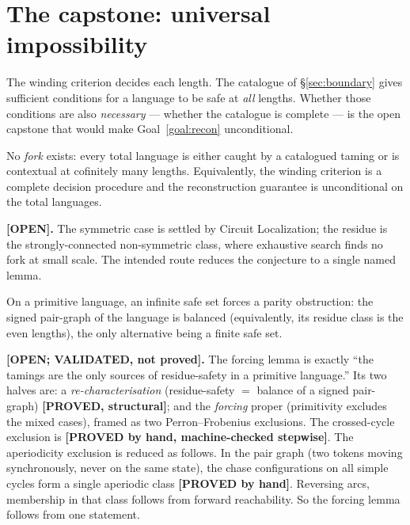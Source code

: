 \section{The capstone: universal impossibility}\label{sec:capstone}

The winding criterion decides each length. The catalogue of \S\ref{sec:boundary}
gives sufficient conditions for a language to be safe at \emph{all} lengths. Whether
those conditions are also \emph{necessary} --- whether the catalogue is complete ---
is the open capstone that would make Goal~\ref{goal:recon} unconditional.

\begin{conjecture}\label{conj:universal}
No \emph{fork} exists: every total language is either caught by a catalogued taming
or is contextual at cofinitely many lengths. Equivalently, the winding criterion is
a complete decision procedure and the reconstruction guarantee is unconditional on
the total languages.
\end{conjecture}

\noindent\textbf{[OPEN].} The symmetric case is settled by Circuit Localization;
the residue is the strongly-connected non-symmetric class, where exhaustive search
finds no fork at small scale. The intended route reduces the conjecture to a single
named lemma.

\begin{namedlemma}\label{lem:forcing}
On a primitive language, an infinite safe set forces a parity obstruction: the
signed pair-graph of the language is balanced (equivalently, its residue class is
the even lengths), the only alternative being a finite safe set.
\end{namedlemma}

\noindent\textbf{[OPEN; VALIDATED, not proved].} The forcing lemma is exactly
``the tamings are the only sources of residue-safety in a primitive language.''
Its two halves are: a \emph{re-characterisation} (residue-safety $=$ balance of a
signed pair-graph) \textbf{[PROVED, structural]}; and the \emph{forcing} proper
(primitivity excludes the mixed cases), framed as two Perron--Frobenius
exclusions. The crossed-cycle exclusion is \textbf{[PROVED by hand, machine-checked
stepwise]}. The aperiodicity exclusion is reduced as follows. In the pair graph
(two tokens moving synchronously, never on the same state), the chase
configurations on all simple cycles form a single aperiodic class
\textbf{[PROVED by hand]}. Reversing arcs, membership in that class follows from
forward reachability. So the forcing lemma follows from one statement.

